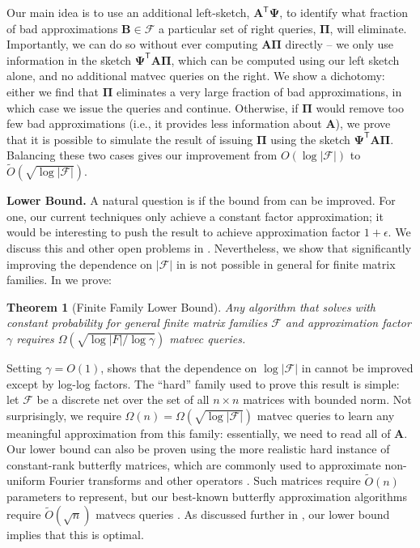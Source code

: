 \documentclass{article}[11pt]
\newtheorem{theorem}{Theorem}
\theoremstyle{definition}
\newcommand{\bv}[1]{\boldsymbol{\mathbf{#1}}}
\newcommand{\T}{\mathsf{T}}
\newcommand{\F}{\mathcal{F}}
\newcommand{\transpose}{\mathsf{T}}
\begin{document}
Our main idea is to use an additional left-sketch, $\bv{A}^\transpose \bv{\Psi}$, to identify what fraction of bad approximations $\bv B \in \F$ a particular set of right queries, $\bv{\Pi}$, will eliminate. Importantly, we can do so without ever computing $\bv{A}\bv{\Pi}$ directly -- we only use information in the sketch  $\bv{\Psi}^\T \bv{A}\bv{\Pi}$, which can be computed using our left sketch alone, and no additional matvec queries on the right. We show a dichotomy: either we find that $\bv{\Pi}$ eliminates a very large fraction of bad approximations, in which case we issue the queries and continue. Otherwise, if $\bv{\Pi}$ would remove too few bad approximations (i.e., it provides less information about $\bv{A}$), we prove that it is possible to simulate the result of issuing $\bv{\Pi}$ using the sketch  $\bv{\Psi}^\T \bv{A}\bv{\Pi}$. Balancing these two cases gives our improvement from $O(\log |\F|)$ to $\tilde O(\sqrt{\log |\F|})$.


\smallskip\noindent \textbf{Lower Bound.} 
A natural question is if the bound from  can be improved. For one, our current techniques only achieve a constant factor approximation; it would be interesting to push the result to achieve approximation factor  $1+\epsilon$. We discuss this and other open problems in .
Nevertheless,  
 we show that significantly improving the dependence on $|\mathcal{F}|$ in  is not possible in general for finite matrix families. In  we prove:
 
\begin{theorem}[Finite Family Lower Bound]
    \label{thm:two_sided_lower_bound} 
    Any algorithm that solves  with constant probability for general finite matrix families $\mathcal{F}$ and approximation factor $\gamma$ requires $\Omega(\sqrt{\log |F|/\log\gamma})$ matvec queries.
\end{theorem}

Setting $\gamma = O(1)$,  shows that the dependence on $\log|\F|$ in  cannot be improved except by log-log factors. 
The ``hard'' family used to prove this result is simple: let $\F$ be a discrete net over the set of all $n \times n$ matrices with bounded norm. Not surprisingly, we require $\Omega(n) = \Omega(\sqrt{\log |\F|})$ matvec queries to learn any meaningful approximation from this family: essentially, we need to read all of $\bv{A}$. 
Our lower bound can also be proven using the more realistic hard instance of constant-rank butterfly matrices, which are commonly used to approximate non-uniform Fourier transforms and other operators \cite{LiuXingGuo:2021}. Such matrices require $\tilde{O}(n)$ parameters to represent, but our best-known butterfly approximation algorithms require $\tilde{O}(\sqrt{n})$ matvecs queries \cite{LiYang:2017}. As discussed further in , our lower bound implies that this is optimal. 
\end{document}
